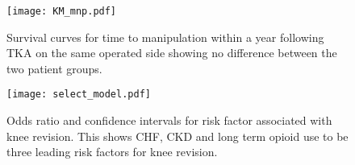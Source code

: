 \documentclass[a4paper]{article}
\begin{document}
\begin{center}
	\begin{figure}
		\centering
			\texttt{[image: KM\_mnp.pdf]}
			\caption{Survival curves for time to manipulation within a year following TKA on the same operated side showing no difference between the two patient groups.}
	\end{figure}
\end{center}


\begin{center}
	\begin{figure}
		\centering
			\texttt{[image: select\_model.pdf]}
			\caption{Odds ratio and confidence intervals for risk factor associated with knee revision. This shows CHF, CKD and long term opioid use to be three leading risk factors for knee revision. }
	\end{figure} 
\end{center}
\end{document}
